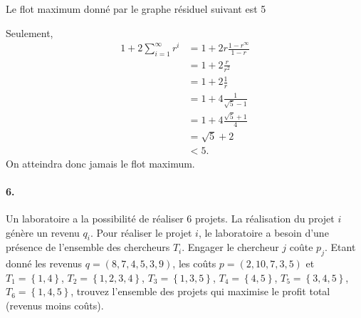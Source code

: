 \begin{solution}
\begin{itemize}
      Le flot maximum donné par le graphe résiduel suivant est 5
      \begin{center}
      \end{center}
      Seulement,
      \begin{align*}
        1 + 2\sum_{i=1}^\infty r^i & = 1 + 2r\frac{1-r^\infty}{1-r}\\
                                   & = 1 + 2\frac{r}{r^2}\\
                                   & = 1 + 2\frac{1}{r}\\
                                   & = 1 + 4\frac{1}{\sqrt{5}-1}\\
                                   & = 1 + 4\frac{\sqrt{5}+1}{4}\\
                                   & = \sqrt{5}+2\\
                                   & < 5.
      \end{align*}
      On atteindra donc jamais le flot maximum.
  \end{itemize}
\end{solution}

\paragraph{6. } Un laboratoire a la possibilité de réaliser 6 projets. La réalisation du projet $i$ génère un revenu $q_i$. Pour réaliser le projet $i$, le laboratoire a besoin d'une présence de l'ensemble des chercheurs $T_i$. Engager le chercheur $j$ coûte $p_j$. Etant donné les revenus $q= (8,7,4,5,3,9)$, les coûts $p=(2,10,7,3,5)$ et $T_1 = \left\lbrace 1, 4 \right\rbrace$, $T_2 = \left\lbrace 1,2,3,4 \right\rbrace$, $T_3 = \left\lbrace 1,3,5 \right\rbrace$, $T_4 = \left\lbrace 4,5 \right\rbrace$, $T_5 = \left\lbrace 3,4,5 \right\rbrace$, $T_6 = \left\lbrace 1, 4,5 \right\rbrace$, trouvez l'ensemble des projets qui maximise le profit total (revenus moins coûts).


